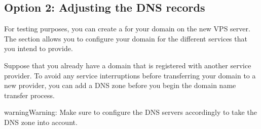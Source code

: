 \documentclass[a4paper,10pt,english,openany,oneside]{sphinxmanual}
\begin{document}
\subsection{Option 2: Adjusting the DNS records}
\label{\detokenize{joomla-to-vps:option-2-adjusting-the-dns-records}}
\sphinxAtStartPar
For testing purposes, you can create a  for your domain on the new VPS server. The  section allows you to configure your domain for the different services that you intend to provide.

\sphinxAtStartPar
Suppose that you already have a domain that is registered with another service provider. To avoid any service interruptions before transferring your domain to a new provider, you can add a DNS zone before you begin the domain name transfer process.

\begin{sphinxadmonition}{warning}{Warning:}
\sphinxAtStartPar
Make sure to configure the DNS servers accordingly to take the DNS zone into account.
\end{sphinxadmonition}
\end{document}
